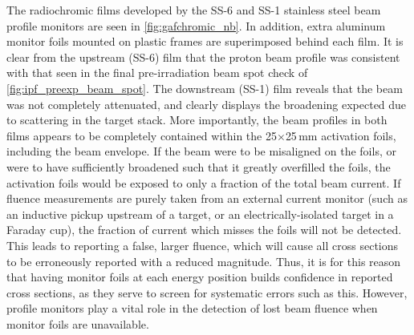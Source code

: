 The radiochromic films developed by the SS-6 and SS-1 stainless steel beam profile monitors are seen in \autoref{fig:gafchromic_nb}.
In addition, extra aluminum monitor foils mounted on  plastic frames are superimposed behind each film.
It is clear from the upstream (SS-6) film that the proton beam profile was consistent with that seen in the final pre-irradiation beam spot check of  \autoref{fig:ipf_preexp_beam_spot}.
The downstream (SS-1) film  reveals that the beam was not completely attenuated,  
and clearly displays the  broadening expected due to scattering in the target stack. 
More importantly, the beam profiles in both films appears to be completely contained within the 25$\times$25\,mm activation foils, including the beam envelope.
If the beam were to be misaligned on the foils, or were to have sufficiently broadened such that it greatly overfilled the foils, the activation foils would be exposed to only a fraction of the total beam current.
If  fluence measurements are purely taken from an external  current monitor (such as an inductive pickup upstream of a target, or an electrically-isolated target in a Faraday cup), the  fraction of current which misses the foils will not be detected.
This leads to reporting a false, larger  fluence, which will cause all cross sections to be erroneously reported with a reduced magnitude.
Thus, it is for this  reason that having monitor foils at each energy position builds confidence in reported cross sections, as they serve to screen for systematic errors such as this.
However, profile monitors play a vital role in the detection of lost beam fluence when monitor foils are unavailable. 







